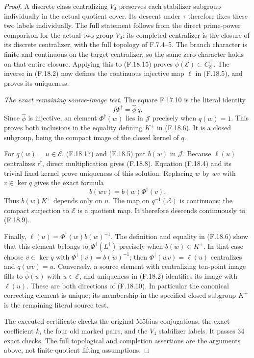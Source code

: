 \begin{proof}
A discrete class centralizing $V_4$
preserves each stabilizer subgroup
individually in the actual quotient
cover.  Its descent under $\tau$
therefore fixes these two labels
individually.
The full statement follows from the
direct prime-power comparison for the
actual two-group $V_4$: its completed
centralizer is the closure of its
discrete centralizer, with the full
topology of F.7.4--5.
The branch character is finite and
continuous on the target centralizer,
so the same zero character holds on
that entire closure.
Applying this to (F.18.15) proves
$\widehat\phi(\mathcal E)\subset C_8^+$.
The inverse in (F.18.2) now defines
the continuous injective map $\ell$
in (F.18.5), and proves its uniqueness.

\emph{The exact remaining source-image test.}
The square F.17.10 is the literal identity
\[
                       f\Phi^\dagger=\widehat\phi\,q .
                                                               \tag{F.18.17}
\]
Since $\widehat\phi$ is injective, an
element $\Phi^\dagger(w)$ lies in
$\mathcal J$ precisely when $q(w)=1$.
This proves both inclusions in the
equality defining $K^+$ in (F.18.6).
It is a closed subgroup, being the
compact image of the closed kernel
of $q$.

For $q(w)=u\in\mathcal E$, (F.18.17)
and (F.18.5) put $b(w)$ in $\mathcal J$.
Because $\ell(u)$ centralizes
$\mathsf r^\dagger$, direct multiplication
gives (F.18.8).
Equation (F.18.4) and its trivial fixed
kernel prove uniqueness of this solution.
Replacing $w$ by $wv$ with $v\in\ker q$
gives the exact formula
\[
                         b(wv)=b(w)\Phi^\dagger(v).
                                                               \tag{F.18.18}
\]
Thus $b(w)K^+$ depends only on $u$.
The map on $q^{-1}(\mathcal E)$ is
continuous; the compact surjection to
$\mathcal E$ is a quotient map.
It therefore descends continuously
to (F.18.9).

Finally,
$\ell(u)=\Phi^\dagger(w)b(w)^{-1}$.
The definition and equality in (F.18.6)
show that this element belongs to
$\Phi^\dagger(L^\dagger)$ precisely
when $b(w)\in K^+$.
In that case choose $v\in\ker q$
with $\Phi^\dagger(v)=b(w)^{-1}$;
then $\Phi^\dagger(wv)=\ell(u)$
centralizes and $q(wv)=u$.
Conversely, a source element with
centralizing ten-point image fills
to $\widehat\phi(u)$ with $u\in\mathcal E$,
and uniqueness in (F.18.2) identifies
its image with $\ell(u)$.
These are both directions of
(F.18.10).
In particular the canonical correcting
element is unique; its membership in
the specified closed subgroup $K^+$
is the remaining literal source test.

The executed certificate
checks the original M\"obius conjugations,
the exact coefficient $k$, the four old
marked pairs, and the $V_4$ stabilizer
labels.  It passes 34 exact checks.
The full topological and completion
assertions are the arguments above,
not finite-quotient lifting assumptions.
\end{proof}

